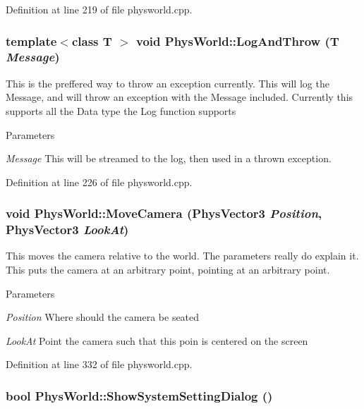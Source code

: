 Definition at line 219 of file physworld.cpp.\hypertarget{classPhysWorld_a1c2aeaed2a89821a4545db854da33ab8}{
\subsubsection[{LogAndThrow}]{\setlength{\rightskip}{0pt plus 5cm}template$<$class T $>$ void PhysWorld::LogAndThrow (T {\em Message})}}
\label{db/df5/classPhysWorld_a1c2aeaed2a89821a4545db854da33ab8}


This is the preffered way to throw an exception currently. This will log the Message, and will throw an exception with the Message included. Currently this supports all the Data type the Log function supports 
\begin{DoxyParams}{Parameters}
\item[{\em Message}]This will be streamed to the log, then used in a thrown exception. \end{DoxyParams}


Definition at line 226 of file physworld.cpp.\hypertarget{classPhysWorld_a1df24ee06d5881825902b60e0d81174a}{
\subsubsection[{MoveCamera}]{\setlength{\rightskip}{0pt plus 5cm}void PhysWorld::MoveCamera ({\bf PhysVector3} {\em Position}, \/  {\bf PhysVector3} {\em LookAt})}}
\label{db/df5/classPhysWorld_a1df24ee06d5881825902b60e0d81174a}


This moves the camera relative to the world. The parameters really do explain it. This puts the camera at an arbitrary point, pointing at an arbitrary point. 
\begin{DoxyParams}{Parameters}
\item[{\em Position}]Where should the camera be seated \item[{\em LookAt}]Point the camera such that this poin is centered on the screen \end{DoxyParams}


Definition at line 332 of file physworld.cpp.\hypertarget{classPhysWorld_a9b83f04907443c6307956a3c4089e3ca}{
\subsubsection[{ShowSystemSettingDialog}]{\setlength{\rightskip}{0pt plus 5cm}bool PhysWorld::ShowSystemSettingDialog ()}}
\label{db/df5/classPhysWorld_a9b83f04907443c6307956a3c4089e3ca}



